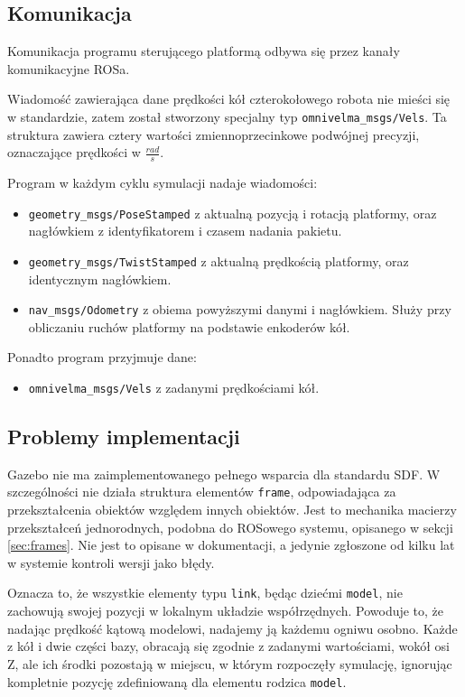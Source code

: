 	\subsection{Komunikacja}
		Komunikacja programu sterującego platformą odbywa się przez kanały komunikacyjne ROSa.

		Wiadomość zawierająca dane prędkości kół czterokołowego robota nie mieści się w standardzie, zatem został stworzony specjalny typ \texttt{omnivelma\_msgs/Vels}.
		Ta struktura zawiera cztery wartości zmiennoprzecinkowe podwójnej precyzji, oznaczające prędkości w $\frac{rad}{s}$.

		Program w każdym cyklu symulacji nadaje wiadomości:
		\begin{itemize}
		\item \texttt{geometry\_msgs/PoseStamped} z aktualną pozycją i rotacją platformy, oraz nagłówkiem z identyfikatorem i czasem nadania pakietu.
		\item \texttt{geometry\_msgs/TwistStamped} z aktualną prędkością platformy, oraz identycznym nagłówkiem.
		\item \texttt{nav\_msgs/Odometry} z obiema powyższymi danymi i nagłówkiem. Służy przy obliczaniu ruchów platformy na podstawie enkoderów kół.
		\end{itemize}
		Ponadto program przyjmuje dane:
		\begin{itemize}
		\item \texttt{omnivelma\_msgs/Vels} z zadanymi prędkościami kół.
		\end{itemize}
	
	\subsection{Problemy implementacji}
		Gazebo nie ma zaimplementowanego pełnego wsparcia dla standardu SDF.
		W szczególności nie działa struktura elementów \texttt{frame}, odpowiadająca za przekształcenia obiektów względem innych obiektów.
		Jest to mechanika macierzy przekształceń jednorodnych, podobna do ROSowego systemu, opisanego w sekcji \ref{sec:frames}.
		Nie jest to opisane w dokumentacji, a jedynie zgłoszone od kilku lat w systemie kontroli wersji jako błędy.

		Oznacza to, że wszystkie elementy typu \texttt{link}, będąc dziećmi \texttt{model}, nie zachowują swojej pozycji w lokalnym układzie współrzędnych.
		Powoduje to, że nadając prędkość kątową modelowi, nadajemy ją każdemu ogniwu osobno.
		Każde z kół i dwie części bazy, obracają się zgodnie z zadanymi wartościami, wokół osi Z, ale ich środki pozostają w miejscu, w którym rozpoczęły symulację,
		ignorując kompletnie pozycję zdefiniowaną dla elementu rodzica \texttt{model}.
		
